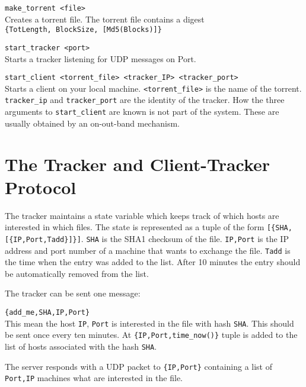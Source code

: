 \documentclass[10pt]{article}
\begin{document}
\begin{description}
  
\item \verb+make_torrent <file>+\\
Creates a torrent file. The torrent file contains
a digest\\
\verb+{TotLength, BlockSize, [Md5(Blocks)]}+

\item \verb+start_tracker <port>+\\
Starts a tracker listening for UDP messages on Port.

\item \verb+start_client <torrent_file> <tracker_IP> <tracker_port>+\\
Starts a client on your local machine. \verb+<torrent_file>+ is the 
name of the torrent. \verb+tracker_ip+ and \verb+tracker_port+
are the identity of the tracker. How the three arguments to
\verb+start_client+ are known is not part of the system. These
are usually obtained by an on-out-band mechanism.

\end{description}

\section{The Tracker and Client-Tracker Protocol}

The tracker maintains a state variable which keeps track of which
hosts are interested in which files.  The state is represented as a
tuple of the form \verb+[{SHA,[{IP,Port,Tadd}]}]+. \verb+SHA+ is the
SHA1 checksum of the file.  \verb+IP,Port+ is the IP address and port
number of a machine that wants to exchange the file. \verb+Tadd+ is
the time when the entry was added to the list. After 10 minutes the
entry should be automatically removed from the list.

The tracker can be sent one message: 

\begin{description}
\item \verb+{add_me,SHA,IP,Port}+\\
This mean the host \verb+IP+, \verb+Port+ is interested in the file
with hash \verb+SHA+. This should be sent once every ten minutes.
At \verb+{IP,Port,time_now()}+ tuple is added to the list of
hosts associated with the hash \verb+SHA+.

The server responds with a UDP packet to \verb+{IP,Port}+
containing a list of \verb+Port,IP+ machines what are interested in the 
file.

\end{description}
\end{document}
